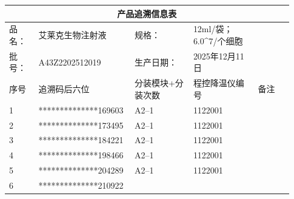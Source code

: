 \documentclass[UTF8,10pt,a4paper,fontset=fandol]{ctexart}
\newcommand{\fieldvalue}[1]{#1}
\begin{document}
\begin{tabular}{|p{0.10\linewidth}|p{0.29\linewidth}|p{0.20\linewidth}|p{0.22\linewidth}|p{0.12\linewidth}|}
\hline
\multicolumn{5}{c|}{\textbf{产品追溯信息表}}\\
\hline
品名：
&
\fieldvalue{艾莱克生物注射液}
&
规格：
&
\fieldvalue{12ml/袋；6.0\times 10^{7}/个细胞}
&
\\
\hline
批号：
&
\fieldvalue{A43Z2202512019}
&
生产日期：
&
\fieldvalue{2025年12月11日}
&
\\
\hline
序号 & 追溯码后六位 & 分装模块+分装次数 & 程控降温仪编号 & 备注\\
\hline
1 &
\fieldvalue{**************169603}
&
\fieldvalue{A2--1}
&
\fieldvalue{1122001}
&\\
\hline
2 &
\fieldvalue{**************173495}
&
\fieldvalue{A2--1}
&
\fieldvalue{1122001}
&\\
\hline
3 &
\fieldvalue{**************184221}
&
\fieldvalue{A2--1}
&
\fieldvalue{1122001}
&\\
\hline
4 &
\fieldvalue{**************198466}
&
\fieldvalue{A2--1}
&
\fieldvalue{1122001}
&\\
\hline
5 &
\fieldvalue{**************204289}
&
\fieldvalue{A2--1}
&
\fieldvalue{1122001}
&\\
\hline
6 &
\fieldvalue{**************210922}
&

\end{tabular}
\end{document}
